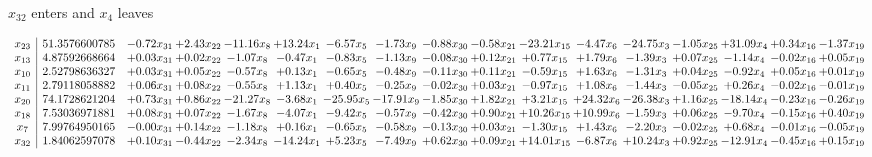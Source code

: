 \documentclass[9pt]{article}
\begin{document}
 $ x_{32} $ enters and $ x_{4} $ leaves 

 \[\begin{array}{c| c c@{\hskip 2pt} c@{\hskip 2pt} c@{\hskip 2pt} c@{\hskip 2pt} c@{\hskip 2pt} c@{\hskip 2pt} c@{\hskip 2pt} c@{\hskip 2pt} c@{\hskip 2pt} c@{\hskip 2pt} c@{\hskip 2pt} c@{\hskip 2pt} c@{\hskip 2pt} c@{\hskip 2pt} c@{\hskip 2pt} }
 x_{23}   &  51.3576600785 & -0.72 x_{31} & +  2.43 x_{22} & -11.16 x_{8} & + 13.24 x_{1} & -6.57 x_{5} & -1.73 x_{9} & -0.88 x_{30} & -0.58 x_{21} & -23.21 x_{15} & -4.47 x_{6} & -24.75 x_{3} & -1.05 x_{25} & + 31.09 x_{4} & +  0.34 x_{16} & -1.37 x_{19}\\
 x_{13}   &  4.87592668664 & +  0.03 x_{31} & +  0.02 x_{22} & -1.07 x_{8} & -0.47 x_{1} & -0.83 x_{5} & -1.13 x_{9} & -0.08 x_{30} & +  0.12 x_{21} & +  0.77 x_{15} & +  1.79 x_{6} & -1.39 x_{3} & +  0.07 x_{25} & -1.14 x_{4} & -0.02 x_{16} & +  0.05 x_{19}\\
 x_{10}   &  2.52798636327 & +  0.03 x_{31} & +  0.05 x_{22} & -0.57 x_{8} & +  0.13 x_{1} & -0.65 x_{5} & -0.48 x_{9} & -0.11 x_{30} & +  0.11 x_{21} & -0.59 x_{15} & +  1.63 x_{6} & -1.31 x_{3} & +  0.04 x_{25} & -0.92 x_{4} & +  0.05 x_{16} & +  0.01 x_{19}\\
 x_{11}   &  2.79118058882 & +  0.06 x_{31} & +  0.08 x_{22} & -0.55 x_{8} & +  1.13 x_{1} & +  0.40 x_{5} & -0.25 x_{9} & -0.02 x_{30} & +  0.03 x_{21} & -0.97 x_{15} & +  1.08 x_{6} & -1.44 x_{3} & -0.05 x_{25} & +  0.26 x_{4} & -0.02 x_{16} & -0.01 x_{19}\\
 x_{20}   &  74.1728621204 & +  0.73 x_{31} & +  0.86 x_{22} & -21.27 x_{8} & -3.68 x_{1} & -25.95 x_{5} & -17.91 x_{9} & -1.85 x_{30} & +  1.82 x_{21} & +  3.21 x_{15} & + 24.32 x_{6} & -26.38 x_{3} & +  1.16 x_{25} & -18.14 x_{4} & -0.23 x_{16} & -0.26 x_{19}\\
 x_{18}   &  7.53036971881 & +  0.08 x_{31} & +  0.07 x_{22} & -1.67 x_{8} & -4.07 x_{1} & -9.42 x_{5} & -0.57 x_{9} & -0.42 x_{30} & +  0.90 x_{21} & + 10.26 x_{15} & + 10.99 x_{6} & -1.59 x_{3} & +  0.06 x_{25} & -9.70 x_{4} & -0.15 x_{16} & +  0.40 x_{19}\\
 x_{7}   &  7.99764950165 & -0.00 x_{31} & +  0.14 x_{22} & -1.18 x_{8} & +  0.16 x_{1} & -0.65 x_{5} & -0.58 x_{9} & -0.13 x_{30} & +  0.03 x_{21} & -1.30 x_{15} & +  1.43 x_{6} & -2.20 x_{3} & -0.02 x_{25} & +  0.68 x_{4} & -0.01 x_{16} & -0.05 x_{19}\\
 x_{32}   &  1.84062597078 & +  0.10 x_{31} & -0.44 x_{22} & -2.34 x_{8} & -14.24 x_{1} & +  5.23 x_{5} & -7.49 x_{9} & +  0.62 x_{30} & +  0.09 x_{21} & + 14.01 x_{15} & -6.87 x_{6} & + 10.24 x_{3} & +  0.92 x_{25} & -12.91 x_{4} & -0.45 x_{16} & +  0.15 x_{19}\\

\end{array}\]
\end{document}
